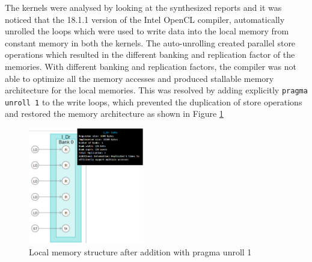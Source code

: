 The kernels were analysed by looking at the synthesized reports and it was noticed that
the 18.1.1 version of the Intel OpenCL compiler, automatically unrolled the loops which were used
to write data into the local memory from constant memory in both the kernels.
The auto-unrolling created parallel store operations which resulted in the
different banking and replication factor of the memories. With different
banking and replication factors, the compiler was not able to optimize
all the memory accesses and produced stallable memory architecture for the
local memories. This was resolved by adding explicitly \texttt{pragma unroll 1} to the
write loops, which prevented the duplication of store operations and
restored the memory architecture as shown in Figure \ref{fig:restored}
\begin{figure}[ht]%
    \centering
    \includegraphics[width=0.45\textwidth]{images/fixed_arb}
    \caption{Local memory structure after addition with pragma unroll 1}
    \label{fig:restored}
\end{figure}


